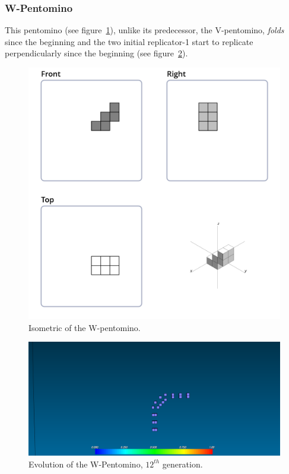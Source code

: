 \subsubsection{W-Pentomino}
\label{sec:w-pentomino}
This pentomino (see figure~\ref{fig:iso-pent-w}), unlike its predecessor, the
V-pentomino, \textit{folds} since the beginning and the two initial replicator-1
start to replicate perpendicularly since the beginning  (see
figure~\ref{fig:ss-pent:w-12}).

\begin{figure}[H]
	\centering
	\includegraphics[scale=0.3]{iso_diagrams/w.png}
	\caption{Isometric of the W-pentomino.}
  \label{fig:iso-pent-w}
\end{figure}

\begin{figure}[H]
	\centering
	\includegraphics[scale=0.3]{pentominoes_ss/w_12.png}
	\caption{Evolution of the W-Pentomino, $12^{th}$ generation.}
	\label{fig:ss-pent:w-12}
\end{figure}

